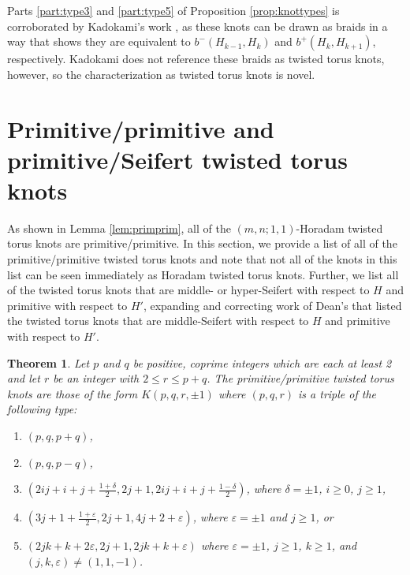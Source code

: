 \documentclass{amsart}
\newtheorem{theorem}{Theorem}
\newcommand{\eps}{\varepsilon}
\begin{document}
Parts \ref{part:type3} and  \ref{part:type5} of Proposition \ref{prop:knottypes} is corroborated by Kadokami's work \cite{Kadokami}, as these knots can be drawn as braids in a way that shows they are equivalent to $b^-(H_{k-1}, H_{k})$ and $b^+(H_{k}, H_{k+1})$, respectively. Kadokami does not reference these braids as twisted torus knots, however, so the characterization as twisted torus knots is novel. 

\section{Primitive/primitive and primitive/Seifert twisted torus knots}\label{primplus}

As shown in Lemma \ref{lem:primprim}, all of the $(m,n; 1,1)$-Horadam twisted torus knots are primitive/primitive. In this section, we provide a list of all of the primitive/primitive twisted torus knots and note that not all of the knots in this list can be seen immediately as Horadam twisted torus knots. Further, we list all of the twisted torus knots that are middle- or hyper-Seifert with respect to $H$ and primitive with respect to $H'$, expanding and correcting work of Dean's that listed the twisted torus knots that are middle-Seifert with respect to $H$ and primitive with respect to $H'$.

\begin{theorem}\label{thm:pp}
Let $p$ and $q$ be positive, coprime integers which are each at least 2 and let $r$ be an integer with $2 \le r \le p+q$. The primitive/primitive twisted torus knots are those of the form $K(p,q,r, \pm 1)$ where $(p,q,r)$ is a triple of the following type:
\begin{enumerate}
\item\label{list:1} $(p,q,p+q)$,
\item\label{list:2} $(p,q,p-q)$,
\item\label{list:3} $(2ij+i + j + \frac{1+\delta}{2}, 2j+1, 2ij + i + j + \frac{1- \delta}{2})$, where $\delta = \pm 1$, $i \ge 0$, $j \ge 1$,
\item\label{list:4} $(3j+1  + \frac{1+\varepsilon}{2}, 2j+1, 4j + 2 + \varepsilon)$, where $\varepsilon = \pm 1$ and $j \ge 1$, or
\item\label{list:5} $(2jk + k + 2 \eps, 2j+1, 2jk+k + \eps)$ where $\eps = \pm 1$, $j \ge 1$, $k \ge 1$, and $(j,k, \eps) \neq (1, 1, -1)$.
\end{enumerate}
\end{theorem}
\end{document}
